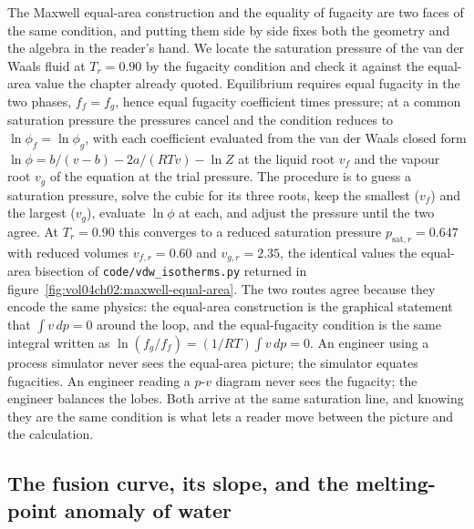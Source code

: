 The Maxwell equal-area construction and the equality of fugacity are two
faces of the same condition, and putting them side by side fixes both the
geometry and the algebra in the reader's hand. We locate the saturation
pressure of the van der Waals fluid at $T_r = 0.90$ by the fugacity
condition and check it against the equal-area value the chapter already
quoted. Equilibrium requires equal fugacity in the two phases, $f_f = f_g$,
hence equal fugacity coefficient times pressure; at a common saturation
pressure the pressures cancel and the condition reduces to $\ln\phi_f =
\ln\phi_g$, with each coefficient evaluated from the van der Waals closed
form $\ln\phi = b/(v-b) - 2a/(RTv) - \ln Z$ at the liquid root $v_f$ and the
vapour root $v_g$ of the equation at the trial pressure. The procedure is to
guess a saturation pressure, solve the cubic for its three roots, keep the
smallest ($v_f$) and the largest ($v_g$), evaluate $\ln\phi$ at each, and
adjust the pressure until the two agree. At $T_r = 0.90$ this converges to a
reduced saturation pressure $p_{\text{sat},r} = 0.647$ with reduced volumes
$v_{f,r} = 0.60$ and $v_{g,r} = 2.35$, the identical values the equal-area
bisection of \texttt{code/vdw\_isotherms.py} returned in
figure~\ref{fig:vol04ch02:maxwell-equal-area}. The two routes agree because
they encode the same physics: the equal-area construction is the graphical
statement that $\int v\,dp = 0$ around the loop, and the equal-fugacity
condition is the same integral written as $\ln(f_g/f_f) = (1/RT)\int v\,dp =
0$. An engineer using a process simulator never sees the equal-area picture;
the simulator equates fugacities. An engineer reading a $p$-$v$ diagram
never sees the fugacity; the engineer balances the lobes. Both arrive at the
same saturation line, and knowing they are the same condition is what lets a
reader move between the picture and the calculation.

\subsection{The fusion curve, its slope, and the melting-point anomaly of
water}

